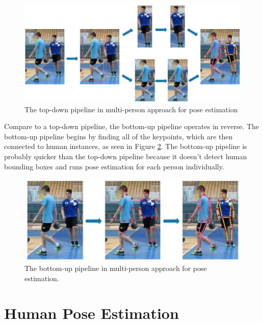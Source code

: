 \begin{figure}[ht]
  \centering
  \includegraphics[scale=0.8]{gambar/top-down-approach.png}
  \caption{The top-down pipeline in multi-person approach for pose estimation}
  \label{fig:top-down-approach}
\end{figure}

Compare to a top-down pipeline, the bottom-up pipeline operates in reverse. The bottom-up pipeline begins by finding all of the keypoints, which are then connected to human instances, as seen in Figure \ref{fig:bottom-up-approach}. 
The bottom-up pipeline is probably quicker than the top-down pipeline because it doesn't detect human bounding boxes and runs pose estimation for each person individually.

\begin{figure}[ht]
  \centering
  \includegraphics[scale=1.2]{gambar/bottom-up-approach.png}
  \caption{The bottom-up pipeline in multi-person approach for pose estimation.}
  \label{fig:bottom-up-approach}
\end{figure}

\section{Human Pose Estimation}
\label{sec:humanposeestimation}

